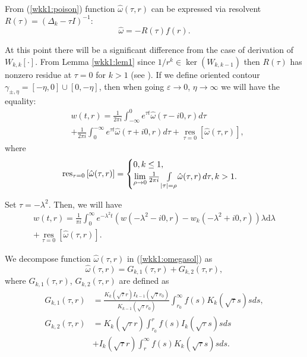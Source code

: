 \documentclass[manuscript, printscheme]{paper}
\begin{document}
From (\ref{wkk1:poison}) function $\hat \omega(\tau,r)$ can be expressed via resolvent $R(\tau) = (\Delta_k-\tau I)^{-1}$:
$$
\hat \omega  = - R(\tau) f(r).
$$

At this point there will be a significant difference from the case of derivation of $W_{k,k}[\cdot]$. From Lemma \ref{wkk1:lem1} since $1/r^k \in \ker(W_{k,k-1})$ then  $R(\tau)$ has nonzero residue at $\tau=0$ for $k>1$ (see \cite{Kato}). If we define oriented contour $\gamma_{\pm,\eta} = [-\eta,0] \cup [0,-\eta]$, then when going $\varepsilon \to 0$, $\eta \to \infty$ we will have the equality:
\begin{align} 
&w(t,r) = 
\frac1{2\pi i} \int_{-\infty}^0 e^{\tau t}\hat \omega(\tau-i0,r)d\tau \nonumber \\  
&+ \frac1{2\pi i}   \int_0^{-\infty} e^{\tau t}\hat \omega(\tau+i0,r)d\tau 
+  \operatorname{res}\limits_{\tau=0}[\hat \omega(\tau,r)] ,  \nonumber
\end{align}
where 
$$
{\mathrm  {res}}_{\tau=0}\,[\hat \omega(\tau,r)]=
\begin{cases} 
 0, k\leq 1, \\
 \lim\limits_{\rho \to 0} {1 \over {2\pi i}}\int \limits _{{|\tau|=\rho }}\!\hat \omega(\tau,r)\,d\tau, k>1.
 \end{cases}
$$ 
 
Set $\tau = -\lambda^2$. Then, we will have  
\begin{eqnarray} \label{wkk1:wsolwithresidue}
w(t,r) = \nonumber 
\frac1{\pi i} \int_0^\infty e^{-\lambda^2 t} \left ( w(-\lambda^2-i0,r)  - w_k(-\lambda^2+i0,r) \right )
 \lambda \mathrm{d}\lambda  \nonumber \\ +  \operatorname{res}\limits_{\tau=0}[\hat \omega(\tau,r)].
\end{eqnarray} 


We decompose function $\hat \omega(\tau,r)$ in (\ref{wkk1:omegasol}) as
$$
 \hat \omega(\tau,r) = G_{k,1}(\tau,r)+ G_{k,2}(\tau,r), 
$$ 
where $G_{k,1}(\tau,r)$, $G_{k,2}(\tau,r)$ are defined as 
\begin{align*}
G_{k,1}(\tau,r) &= \frac{K_k(\sqrt{\tau}r) I_{k-1}(\sqrt \tau r_0)}{K_{k-1}(\sqrt \tau r_0)} \int_{r_0}^\infty f(s) K_k(\sqrt{\tau}s) s ds, \nonumber \\
G_{k,2}(\tau,r) &= K_k(\sqrt{\tau}r)\int_{r_0}^r f(s) I_k(\sqrt{\tau}s) s ds \nonumber \\ 
&+ I_k(\sqrt{\tau}r)\int_r^{\infty} f(s) K_k(\sqrt{\tau}s) sds. \nonumber
\end{align*}
\end{document}
